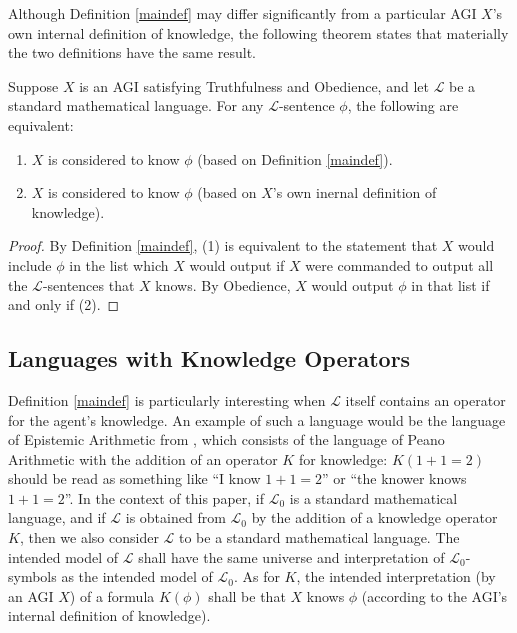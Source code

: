 \documentclass[runningheads]{llncs}
\begin{document}
Although Definition \ref{maindef} may differ significantly from a particular AGI
$X$'s own internal definition of knowledge, the following theorem states that
materially the two definitions have the same result.

\begin{theorem}
\label{sentenceequivalence}
  Suppose $X$ is an AGI satisfying Truthfulness and Obedience, and let $\mathscr L$
  be a standard mathematical language. For any $\mathscr L$-sentence $\phi$, the following
  are equivalent:
  \begin{enumerate}
    \item $X$ is
    considered to know $\phi$ (based on Definition \ref{maindef}).
    \item
    $X$ is considered to know $\phi$ (based on $X$'s own inernal definition of
    knowledge).
  \end{enumerate}
\end{theorem}

\begin{proof}
  By Definition \ref{maindef}, (1) is equivalent to the statement that $X$ would
  include $\phi$ in the list which $X$ would output if $X$ were commanded to output
  all the $\mathscr L$-sentences that $X$ knows. By Obedience, $X$ would output
  $\phi$ in that list if and only if (2).
\end{proof}

\subsection{Languages with Knowledge Operators}

Definition \ref{maindef} is particularly interesting when $\mathscr L$ itself
contains an operator for the agent's knowledge. An example of such a language would be
the language of Epistemic Arithmetic from \cite{shapiro}, which consists of the
language of Peano Arithmetic with the addition of an operator $K$ for knowledge:
$K(1+1=2)$ should be read as something like
``I know $1+1=2$'' or ``the knower knows $1+1=2$''. In the context of this paper,
if $\mathscr L_0$ is a standard mathematical language, and if $\mathscr L$ is obtained
from $\mathscr L_0$ by the addition of a knowledge operator $K$, then we also
consider $\mathscr L$ to be a standard mathematical language. The intended model
of $\mathscr L$ shall have the same universe and interpretation of
$\mathscr L_0$-symbols as the intended model of $\mathscr L_0$. As for $K$,
the intended interpretation (by an AGI $X$) of a formula $K(\phi)$ shall be
that $X$ knows $\phi$ (according to the AGI's internal definition of knowledge).
\end{document}
